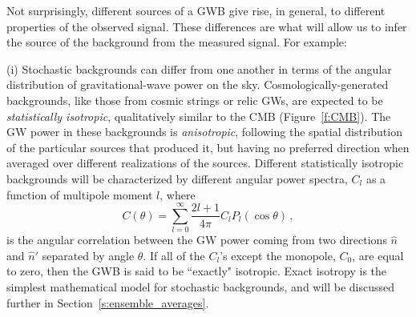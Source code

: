 \documentclass[11pt]{article}
\numberwithin{equation}{section}
\def\be{\begin{equation}}
\def\ee{\end{equation}}
\begin{document}
Not surprisingly, different sources of a GWB give
rise, in general, to different properties of the 
observed signal.
These differences are what will allow us to infer 
the source of the background from the measured signal.
For example:

(i) Stochastic backgrounds can differ from one another 
in terms of the angular distribution of 
gravitational-wave power on the sky.
Cosmologically-generated backgrounds, like those from 
cosmic strings or relic GWs,
are expected to be {\em statistically isotropic},
qualitatively similar to the CMB (Figure~\ref{f:CMB}).
The GW power in these backgrounds is {\em anisotropic}, 
following the spatial distribution of the particular
sources that produced it, but having no preferred 
direction when averaged over different realizations 
of the sources.
Different statistically isotropic backgrounds will
be characterized by different angular power spectra,
$C_l$ as a function of multipole moment $l$, where
%
\be
C(\theta) = \sum_{l=0}^\infty \frac{2l+1}{4\pi} 
C_l P_l(\cos\theta)\,,
\label{e:legendre_series}
\ee
%
is the angular correlation between the GW power 
coming from two directions $\hat n$ and $\hat n'$
separated by angle $\theta$.
If all of the $C_l$'s except the monopole, $C_0$, 
are equal to zero, then the GWB is said to be 
``exactly" isotropic.
Exact isotropy is the simplest mathematical model 
for stochastic backgrounds, and will be discussed
further in Section~\ref{s:ensemble_averages}.
\end{document}
